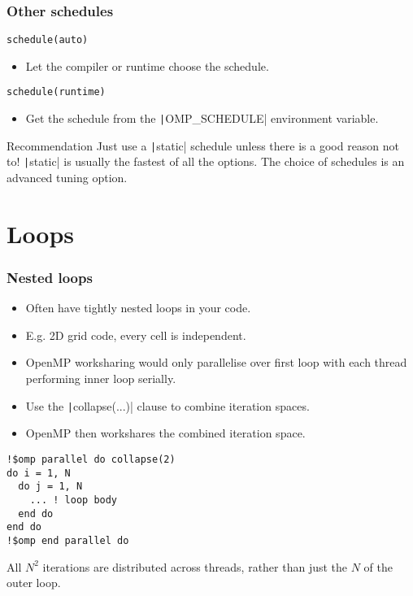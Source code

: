 \documentclass{beamer}
\begin{document}
\begin{frame}[fragile]
\frametitle{Other schedules}
\begin{verbatim}
schedule(auto)
\end{verbatim}
\begin{itemize}
  \item Let the compiler or runtime choose the schedule.
\end{itemize}

\vfill

\begin{verbatim}
schedule(runtime)
\end{verbatim}
\begin{itemize}
  \item Get the schedule from the \texttt|OMP_SCHEDULE| environment variable.
\end{itemize}

\begin{block}{Recommendation}
Just use a \texttt|static| schedule unless there is a good reason not to!
\texttt|static| is usually the fastest of all the options.
The choice of schedules is an advanced tuning option.
\end{block}

\end{frame}

\section{Loops}
\begin{frame}[fragile]
\frametitle{Nested loops}
\begin{itemize}
  \item Often have tightly nested loops in your code.
  \item E.g. 2D grid code, every cell is independent.
  \item OpenMP worksharing would only parallelise over first loop with each thread performing inner loop serially.
  \item Use the \texttt|collapse(...)| clause to combine iteration spaces.
  \item OpenMP then workshares the combined iteration space.
\end{itemize}

\begin{verbatim}
!$omp parallel do collapse(2)
do i = 1, N
  do j = 1, N
    ... ! loop body
  end do
end do
!$omp end parallel do
\end{verbatim}
All $N^2$ iterations are distributed across threads, rather than just the $N$ of the outer loop.

\end{frame}
\end{document}
